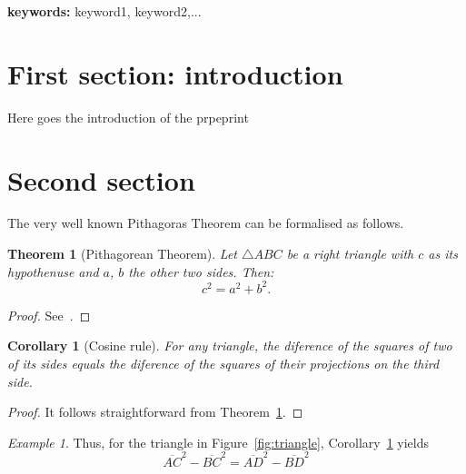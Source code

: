 \documentclass[10pt,twoside]{article}
\newtheorem{thm}{Theorem}
\newtheorem{cor}{Corollary}
\theoremstyle{remark}
\newtheorem{example}{Example}
\theoremstyle{definition}
\begin{document}
\textbf{keywords:} keyword1, keyword2,...

\tableofcontents

\section{First section: introduction}\label{sec:1stSection}
\noindent Here goes the introduction of the prpeprint

\section{Second section}\label{sec:2ndSection}
\noindent 
The very well known Pithagoras Theorem can be formalised as follows.


\begin{thm}[Pithagorean Theorem]\label{teor:Pithagoras}
	Let $\bigtriangleup\!ABC$ be a right triangle with $c$ as its
	hypothenuse and $a$, $b$ the other two sides. Then: 
	\begin{displaymath}
		c^{2} = a^{2} + b^{2}.
	\end{displaymath}	
\end{thm}

\begin{proof}
	See~\cite{Loomis_ElisaS68}.
\end{proof}

\begin{cor}[Cosine rule]\label{cor:cosRule}
	For any triangle, the diference of the squares of two of its sides
	equals the diference of the squares of their projections on the third
	side.
\end{cor}

\begin{proof}
	It follows straightforward from Theorem~\ref{teor:Pithagoras}. 
\end{proof}

\begin{example}
Thus, for the triangle in Figure~\ref{fig:triangle},
Corollary~\ref{cor:cosRule} yields
\begin{equation}
	\overline{AC}^{2} - \overline{BC}^{2} = \overline{AD}^{2} 
	- \overline{BD}^{2}
\end{equation}
\end{example}
\end{document}
